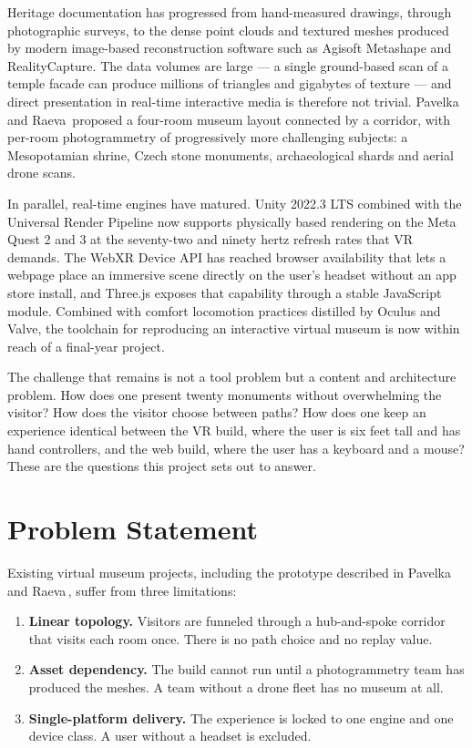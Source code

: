 Heritage documentation has progressed from hand-measured drawings, through photographic surveys, to the dense point clouds and textured meshes produced by modern image-based reconstruction software such as Agisoft Metashape and RealityCapture. The data volumes are large --- a single ground-based scan of a temple facade can produce millions of triangles and gigabytes of texture --- and direct presentation in real-time interactive media is therefore not trivial. Pavelka and Raeva\,\cite{pavelka2019} proposed a four-room museum layout connected by a corridor, with per-room photogrammetry of progressively more challenging subjects: a Mesopotamian shrine, Czech stone monuments, archaeological shards and aerial drone scans.

In parallel, real-time engines have matured. Unity 2022.3 LTS combined with the Universal Render Pipeline now supports physically based rendering on the Meta Quest 2 and 3 at the seventy-two and ninety hertz refresh rates that VR demands. The WebXR Device API has reached browser availability that lets a webpage place an immersive scene directly on the user's headset without an app store install, and Three.js exposes that capability through a stable JavaScript module. Combined with comfort locomotion practices distilled by Oculus and Valve, the toolchain for reproducing an interactive virtual museum is now within reach of a final-year project.

The challenge that remains is not a tool problem but a content and architecture problem. How does one present twenty monuments without overwhelming the visitor? How does the visitor choose between paths? How does one keep an experience identical between the VR build, where the user is six feet tall and has hand controllers, and the web build, where the user has a keyboard and a mouse? These are the questions this project sets out to answer.

\section{Problem Statement}

Existing virtual museum projects, including the prototype described in Pavelka and Raeva\,\cite{pavelka2019}, suffer from three limitations:

\begin{enumerate}
\item \textbf{Linear topology.} Visitors are funneled through a hub-and-spoke corridor that visits each room once. There is no path choice and no replay value.
\item \textbf{Asset dependency.} The build cannot run until a photogrammetry team has produced the meshes. A team without a drone fleet has no museum at all.
\item \textbf{Single-platform delivery.} The experience is locked to one engine and one device class. A user without a headset is excluded.
\end{enumerate}

